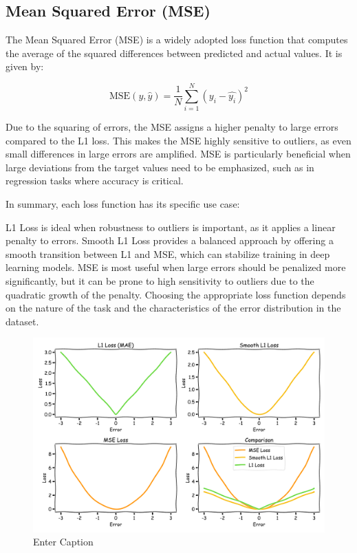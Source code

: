 \subsection{Mean Squared Error (MSE)}
The Mean Squared Error (MSE) is a widely adopted loss function that computes the average of the squared differences between predicted and actual values. It is given by:

\begin{equation}
    \text{MSE}(y, \hat{y}) = \frac{1}{N} \sum_{i=1}^{N} (y_i - \hat{y_i})^2
\end{equation}



Due to the squaring of errors, the MSE assigns a higher penalty to large errors compared to the L1 loss. This makes the MSE highly sensitive to outliers, as even small differences in large errors are amplified. MSE is particularly beneficial when large deviations from the target values need to be emphasized, such as in regression tasks where accuracy is critical.


In summary, each loss function has its specific use case:

L1 Loss is ideal when robustness to outliers is important, as it applies a linear penalty to errors.
Smooth L1 Loss provides a balanced approach by offering a smooth transition between L1 and MSE, which can stabilize training in deep learning models.
MSE is most useful when large errors should be penalized more significantly, but it can be prone to high sensitivity to outliers due to the quadratic growth of the penalty.
Choosing the appropriate loss function depends on the nature of the task and the characteristics of the error distribution in the dataset.




\begin{figure}
    \centering
    \includegraphics[width=1\linewidth]{LateX/figs/loss_functions_xkcd.pdf}
    \caption{Enter Caption}
    \label{fig:enter-label}
\end{figure}


